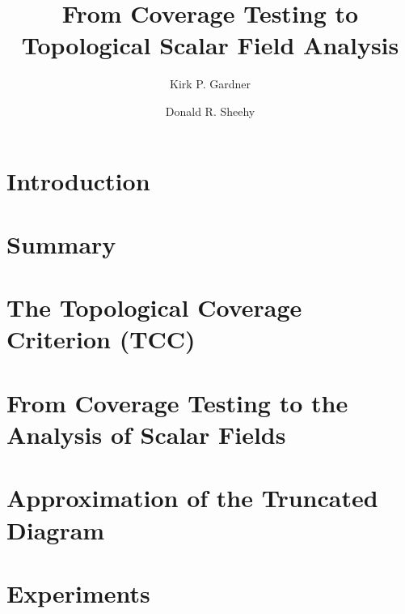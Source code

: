 \documentclass[a4paper,UKenglish,cleveref, autoref, thm-restate]{lipics/socg-lipics-v2019}
\title{From Coverage Testing to Topological Scalar Field Analysis} %
\author{Kirk P. Gardner}{North Carolina State University, United States}{kpgardn2@ncsu.edu}{[orcid]}{[funding]}%
\author{Donald R. Sheehy}{North Carolina State University, United States}{don.r.sheehy@gmail.com}{[orcid]}{[funding]}
\begin{document}
\maketitle



\section{Introduction}\label{sec:introduction}



\section{Summary}\label{sec:summary}


\section{The Topological Coverage Criterion (TCC)}\label{sec:tcc}


\section{From Coverage Testing to the Analysis of Scalar Fields}\label{sec:middle}


% 


\section{Approximation of the Truncated Diagram}\label{sec:truncations}

\section{Experiments}\label{sec:experiments}
%




\end{document}
